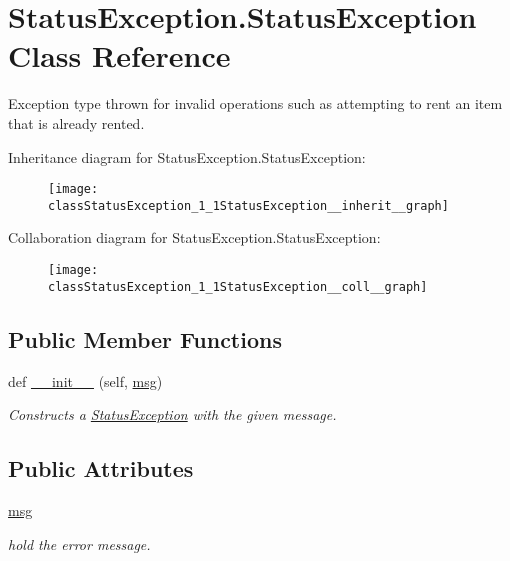 \hypertarget{classStatusException_1_1StatusException}{}\section{Status\+Exception.\+Status\+Exception Class Reference}
\label{classStatusException_1_1StatusException}


Exception type thrown for invalid operations such as attempting to rent an item that is already rented.  




Inheritance diagram for Status\+Exception.\+Status\+Exception\+:\nopagebreak
\begin{figure}[H]
\begin{center}
\leavevmode
\texttt{[image: classStatusException\_1\_1StatusException\_\_inherit\_\_graph]}
\end{center}
\end{figure}


Collaboration diagram for Status\+Exception.\+Status\+Exception\+:\nopagebreak
\begin{figure}[H]
\begin{center}
\leavevmode
\texttt{[image: classStatusException\_1\_1StatusException\_\_coll\_\_graph]}
\end{center}
\end{figure}
\subsection*{Public Member Functions}
\begin{DoxyCompactItemize}
\item 
def \hyperlink{classStatusException_1_1StatusException_a2b3f98decbd77f5e59626b9b50b27a36}{\+\_\+\+\_\+init\+\_\+\+\_\+} (self, \hyperlink{classStatusException_1_1StatusException_a4f3ffa4a96ccf5ca673e9e800d2f4c56}{msg})
\begin{DoxyCompactList}\small\item\em Constructs a \hyperlink{classStatusException_1_1StatusException}{Status\+Exception} with the given message. \end{DoxyCompactList}\end{DoxyCompactItemize}
\subsection*{Public Attributes}
\begin{DoxyCompactItemize}
\item 
\hyperlink{classStatusException_1_1StatusException_a4f3ffa4a96ccf5ca673e9e800d2f4c56}{msg}
\begin{DoxyCompactList}\small\item\em hold the error message. \end{DoxyCompactList}\end{DoxyCompactItemize}



